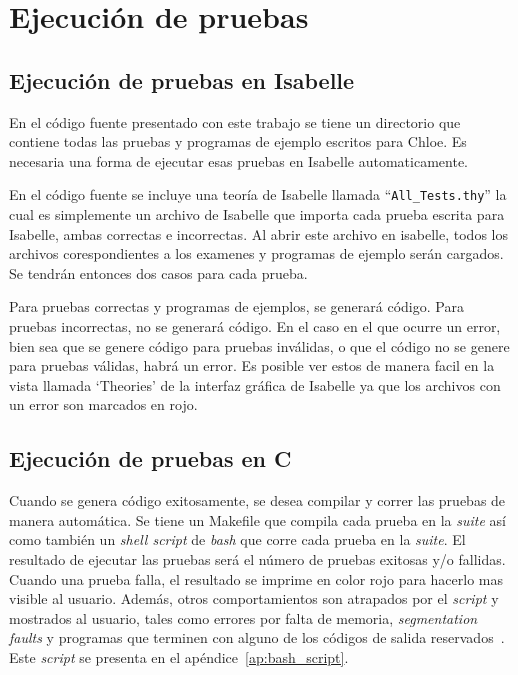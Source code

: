 \section{Ejecución de pruebas}

\subsection{Ejecución de pruebas en Isabelle}

En el código fuente presentado con este trabajo se tiene un directorio que contiene todas las pruebas y programas de ejemplo escritos para Chloe.
Es necesaria una forma de ejecutar esas pruebas en Isabelle automaticamente.

En el código fuente se incluye una teoría de Isabelle llamada ``\verb|All_Tests.thy|'' la cual es simplemente un archivo de Isabelle que importa cada prueba escrita para Isabelle, ambas correctas e incorrectas.
Al abrir este archivo en isabelle, todos los archivos corespondientes a los examenes y programas de ejemplo serán cargados.
Se tendrán entonces dos casos para cada prueba.

Para pruebas correctas y programas de ejemplos, se generará código.
Para pruebas incorrectas, no se generará código.
En el caso en el que ocurre un error, bien sea que se genere código para pruebas inválidas, o que el código no se genere para pruebas válidas, habrá un error.
Es posible ver estos de manera facil en la vista llamada `Theories' de la interfaz gráfica de Isabelle ya que los archivos con un error son marcados en rojo.

\subsection{Ejecución de pruebas en C}

Cuando se genera código exitosamente, se desea compilar y correr las pruebas de manera automática.
Se tiene un Makefile que compila cada prueba en la \textit{suite} así como también un \textit{shell script} de \textit{bash} que corre cada prueba en la \textit{suite}.
El resultado de ejecutar las pruebas será el número de pruebas exitosas y/o fallidas.
Cuando una prueba falla, el resultado se imprime en color rojo para hacerlo mas visible al usuario.
Además, otros comportamientos son atrapados por el \textit{script} y mostrados al usuario, tales como errores por falta de memoria, \textit{segmentation faults} y programas que terminen con alguno de los códigos de salida reservados~\cite{bash-scripting}.
Este \textit{script} se presenta en el apéndice~\ref{ap:bash_script}.

